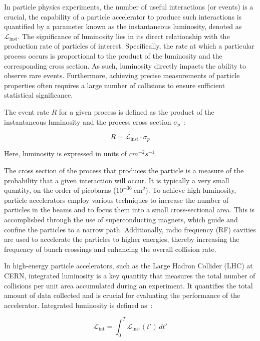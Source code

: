 In particle physics experiments, the number of useful interactions (or events) is a crucial, the capability of a particle accelerator to produce such interactions is quantified by a parameter known as the instantaneous luminosity, denoted as $\mathcal{L}_{\text{inst}}$. The significance of luminosity lies in its direct relationship with the production rate of particles of interest. Specifically, the rate at which a particular process occurs is proportional to the product of the luminosity and the corresponding cross section. As such, luminosity directly impacts the ability to observe rare events. Furthermore, achieving precise measurements of particle properties often requires a large number of collisions to ensure sufficient statistical significance.

The event rate $R$ for a given process is defined as the product of the instantaneous luminosity and the process cross section $\sigma_p$~\cite{concept_of_luminosity}:

\begin{equation}
R = \mathcal{L}_{\text{inst}} \cdot \sigma_p
\label{eq.lumi}
\end{equation}

Here, luminosity is expressed in units of $cm^{-2}s^{-1}$.

The cross section of the process that produces the particle is a measure of the probability that a given interaction will occur. It is typically a very small quantity, on the order of picobarns ($10^{-36}~\text{cm}^2$). To achieve high luminosity, particle accelerators employ various techniques to increase the number of particles in the beams and to focus them into a small cross-sectional area. This is accomplished through the use of superconducting magnets, which guide and confine the particles to a narrow path. Additionally, radio frequency (RF) cavities are used to accelerate the particles to higher energies, thereby increasing the frequency of bunch crossings and enhancing the overall collision rate.


In high-energy particle accelerators, such as the Large Hadron Collider (LHC) at CERN, integrated luminosity is a key quantity that measures the total number of collisions per unit area accumulated during an experiment. It quantifies the total amount of data collected and is crucial for evaluating the performance of the accelerator. Integrated luminosity is defined as~\cite{concept_of_luminosity}:

\begin{equation}
  \mathcal{L}_{\text{int}} = \int_{0}^{T} \mathcal{L}_{\text{inst}}(t')\,dt'
\end{equation}

